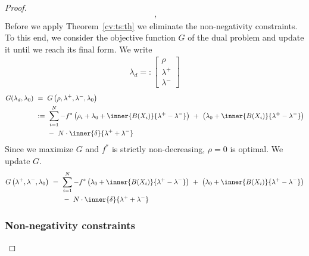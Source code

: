 \begin{proof}
\begin{gather*}
  \,,
\end{gather*}
Before we apply Theorem~\ref{cv:ts:th}
we eliminate the non-negativity constraints.
To this end, we consider the objective function $G$ of the dual
problem and update it until we reach its final form.
We write
\begin{gather}
  \lambda_d
  =:
  \begin{bmatrix}
    \rho\\
    \lambda^+\\
    \lambda^-
  \end{bmatrix}
\end{gather}
\begin{align*}
G(\lambda_d,\lambda_0)
&
\ 
=
\ 
G
\left( 
\rho,
  \lambda^+,
  \lambda^-,
\lambda_0
\right)
\\
&
\ 
:=
\ 
    \sum_{i = 1}^{N} 
    -
    f^*
    \left( 
    \rho_i
    +
    \lambda_0
    +
    \inner{B(X_i)}
    {\lambda^+-\lambda^-}
    \right)
    \ 
    +
    \ 
    \left( 
    \lambda_0
    +
    \inner{B(X_i)}
    {\lambda^+-\lambda^-}
    \right)
\\
&
    \qquad 
    -
    \ 
    N
    \cdot
    \inner{\delta}
    {\lambda^++\lambda^-}
\end{align*}
Since we maximize $G$ and $f^*$ is strictly non-decreasing, 
$\rho=0$ is optimal. We update $G$.
\begin{align*}
G
\left( 
  \lambda^+,
  \lambda^-,
\lambda_0
\right)
&
\ 
=
\ 
    \sum_{i = 1}^{N} 
    -
    f^*
    \left( 
    \lambda_0
    +
    \inner{B(X_i)}
    {\lambda^+-\lambda^-}
    \right)
    \ 
    +
    \ 
    \left( 
    \lambda_0
    +
    \inner{B(X_i)}
    {\lambda^+-\lambda^-}
    \right)
\\
&
    \qquad 
    -
    \ 
    N
    \cdot
    \inner{\delta}
    {\lambda^++\lambda^-}
\end{align*}

\subsubsection*{Non-negativity constraints}


\end{proof}
